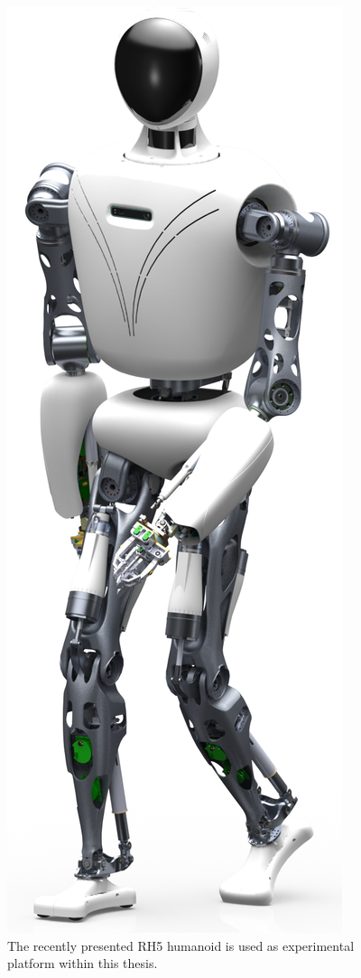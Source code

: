 \begin{figure}[h!]
\centering	
\includegraphics[width=.25\textwidth]{img/rh5_robot.png}
\caption{The recently presented RH5 humanoid is used as experimental platform within this thesis.}
\label{img:rh5_robot}
\end{figure} 













